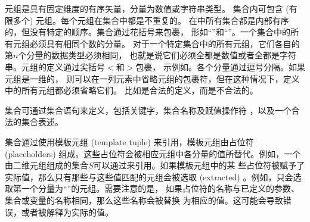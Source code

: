 元组是具有固定维度的有序矢量，分量为数值或字符串类型。
集合内可包含 (有限多个) 元组。每个元组在集合中都是不重复的。
在\zimpl 中所有集合都是内部有序的，但没有特定的顺序。集合通过花括号来包裹，
形如“\code{\{}”和“\code{\}}”。一个集合中的所有元组必须具有相同个数的分量。
对于一个特定集合中的所有元组，它们各自的第$n$个分量的数据类型必须相同，
也就是说它们必须全都是数值或者全都是字符串。元组的定义通过尖括号$<$和$>$包裹，
示例如。各个分量通过逗号分隔。如果元组是一维的，
则可以在一列元素中省略元组的包裹符，但在这种情况下，定义中的所有元组都必须省略它们。
比如是合法的定义，而是不合法的。

集合可通过集合语句来定义，包括关键字，集合名称及赋值操作符
\code{:=}，以及一个合法的集合表述。

集合通过使用模板元组 (template tuple) 来引用，模板元组由占位符 
(placeholders) 组成。这些占位符会被相应元组中各分量的值所替代。例如，一个
由二维元组组成的集合$S$可以通过来引用。如果模板元组中的某
些占位符被赋予了实际值，那么只有那些与这些值匹配的元组会被选取 (extracted) 
。例如，只会选取第一个分量为“”的元组。需要注意的是，
如果占位符的名称与已定义的参数、集合或变量的名称相同，那么这些名称会被替换
为相应的值。这可能会导致错误，或者被解释为实际的值。

